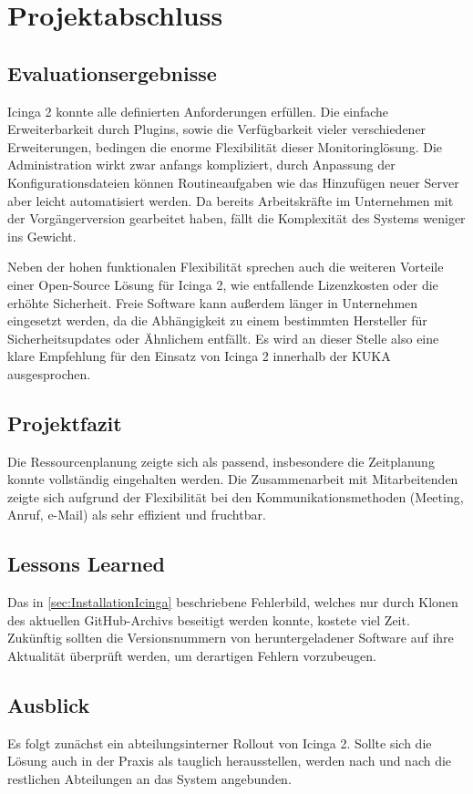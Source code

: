 \section{Projektabschluss} 
\label{sec:projektabschluss}

\subsection{Evaluationsergebnisse}
\label{sec:Evaluationsergebnisse}
\glqq{}Icinga 2\grqq{} konnte alle definierten Anforderungen erfüllen. Die einfache Erweiterbarkeit durch Plugins, sowie die Verfügbarkeit vieler verschiedener Erweiterungen, bedingen die enorme Flexibilität dieser Monitoringlösung. Die Administration wirkt zwar anfangs kompliziert, durch Anpassung der Konfigurationsdateien können Routineaufgaben wie das Hinzufügen neuer Server aber leicht automatisiert werden. Da bereits Arbeitskräfte im Unternehmen mit der Vorgängerversion gearbeitet haben, fällt die Komplexität des Systems weniger ins Gewicht.

Neben der hohen funktionalen Flexibilität sprechen auch die weiteren Vorteile einer Open-Source Lösung für \glqq{}Icinga 2\grqq{}, wie entfallende Lizenzkosten oder die erhöhte Sicherheit. Freie Software kann außerdem länger in Unternehmen eingesetzt werden, da die Abhängigkeit zu einem bestimmten Hersteller für Sicherheitsupdates oder Ähnlichem entfällt. Es wird an dieser Stelle also eine klare Empfehlung für den Einsatz von \grqq{}Icinga 2\grqq{} innerhalb der KUKA ausgesprochen.

\subsection{Projektfazit}
\label{sec:Projektfazit}
Die Ressourcenplanung zeigte sich als passend, insbesondere die Zeitplanung konnte vollständig eingehalten werden. Die Zusammenarbeit mit Mitarbeitenden zeigte sich aufgrund der Flexibilität bei den Kommunikationsmethoden (Meeting, Anruf, e-Mail) als sehr effizient und fruchtbar.

\subsection{Lessons Learned}
\label{sec:LessonsLearned}
Das in \ref{sec:InstallationIcinga}  beschriebene Fehlerbild, welches nur durch Klonen des aktuellen GitHub-Archivs beseitigt werden konnte, kostete viel Zeit. Zukünftig sollten die Versionsnummern von heruntergeladener Software auf ihre Aktualität überprüft werden, um derartigen Fehlern vorzubeugen.

\subsection{Ausblick}
\label{sec:Ausblick}
Es folgt zunächst ein abteilungsinterner Rollout von \glqq{}Icinga 2\grqq{}. Sollte sich die Lösung auch in der Praxis als tauglich herausstellen, werden nach und nach die restlichen Abteilungen an das System angebunden.